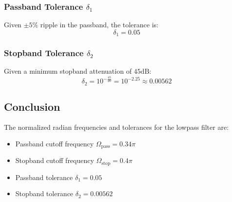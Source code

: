 \subsubsection*{Passband Tolerance \( \delta_1 \)}
Given \( \pm 5\% \) ripple in the passband, the tolerance is:
\[
\delta_1 = 0.05
\]

\subsubsection*{Stopband Tolerance \( \delta_2 \)}
Given a minimum stopband attenuation of \( 45 \text{dB} \):
\[
\delta_2 = 10^{-\frac{45}{20}} = 10^{-2.25} \approx 0.00562
\]

\subsection*{Conclusion}
The normalized radian frequencies and tolerances for the lowpass filter are:
\begin{itemize}
    \item Passband cutoff frequency \( \Omega_{\text{pass}} = 0.34\pi \)
    \item Stopband cutoff frequency \( \Omega_{\text{stop}} = 0.4\pi \)
    \item Passband tolerance \( \delta_1 = 0.05 \)
    \item Stopband tolerance \( \delta_2 = 0.00562 \)
\end{itemize}
